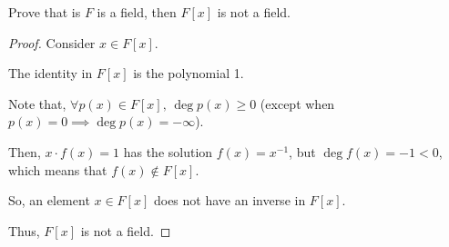 \documentclass[../hw4]{subfiles}
\begin{document}
\begin{problem}
Prove that is $F$ is a field, then  $F[x]$ is not a field.
\end{problem}
\begin{proof}
	Consider $x \in F[x]$.

	The identity in $F[x]$ is the polynomial 1.

	Note that,  $\forall p(x)\in F[x],\, \deg{p(x)}\ge 0$ (except when $p(x)=0 \implies \deg{p(x)}=-\infty$).

	Then, $x\cdot f(x)=1$ has the solution $f(x)=x^{-1}$, but $\deg{f(x)}=-1<0$, which means that $f(x) \not\in F[x]$.

	So, an element  $x \in F[x]$ does not have an inverse in $F[x]$.

	Thus, $F[x]$ is not a field.
\end{proof}
\end{document}
